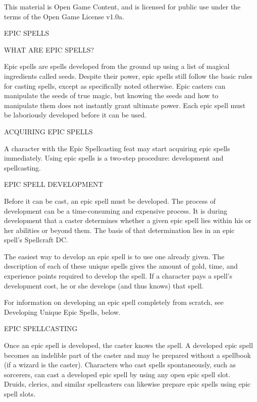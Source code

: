 \documentclass{article}
\begin{document}
This material is Open Game Content, and is licensed for public use under the terms 
of the Open Game License v1.0a.

{\LARGE{}EPIC SPELLS}

\vspace{12pt}
WHAT ARE EPIC SPELLS? 

Epic spells are spells developed from the ground up using a list of magical ingredients 
called seeds. Despite their power, epic spells still follow the basic rules for 
casting spells, except as specifically noted otherwise. Epic casters can manipulate 
the seeds of true magic, but knowing the seeds and how to manipulate them does 
not instantly grant ultimate power. Each epic spell must be laboriously developed 
before it can be used. 

\vspace{12pt}
ACQUIRING EPIC SPELLS 

A character with the Epic Spellcasting feat may start acquiring epic spells immediately. 
Using epic spells is a two-step procedure: development and spellcasting. 

\vspace{12pt}
EPIC SPELL DEVELOPMENT 

Before it can be cast, an epic spell must be developed. The process of development 
can be a time-consuming and expensive process. It is during development that a 
caster determines whether a given epic spell lies within his or her abilities or 
beyond them. The basis of that determination lies in an epic spell's Spellcraft 
DC. 

The easiest way to develop an epic spell is to use one already given. The description 
of each of these unique spells gives the amount of gold, time, and experience points 
required to develop the spell. If a character pays a spell's development cost, 
he or she develops (and thus knows) that spell. 

For information on developing an epic spell completely from scratch, see Developing 
Unique Epic Spells, below. 

\vspace{12pt}
EPIC SPELLCASTING 

Once an epic spell is developed, the caster knows the spell. A developed epic spell 
becomes an indelible part of the caster and may be prepared without a spellbook 
(if a wizard is the caster). Characters who cast spells spontaneously, such as 
sorcerers, can cast a developed epic spell by using any open epic spell slot. Druids, 
clerics, and similar spellcasters can likewise prepare epic spells using epic spell 
slots. 
\end{document}
